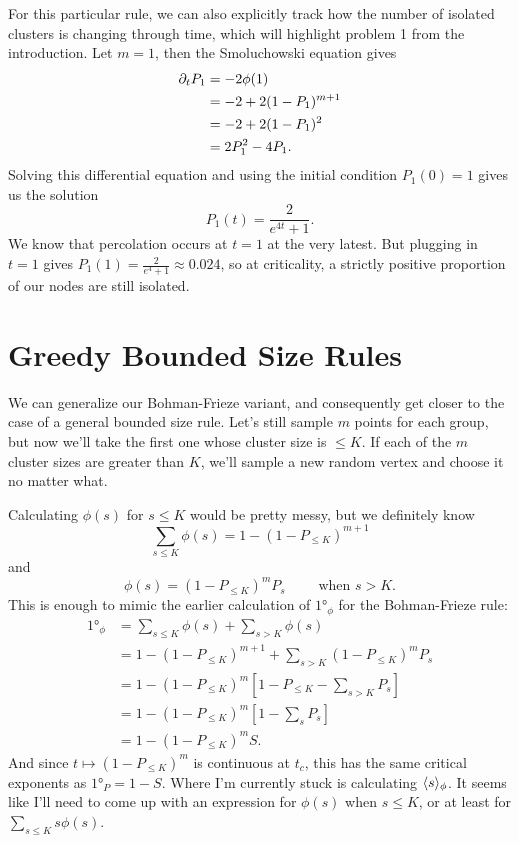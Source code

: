 \documentclass[twoside,10pt]{article}
\newcommand{\BF}{Bohman-Frieze\xspace}
\begin{document}
For this particular rule, we can also explicitly track how the number of isolated clusters is changing through time, which will highlight problem 1 from the introduction. Let $m=1$, then the Smoluchowski equation gives
\begin{align*}
	\partial_{t}{P_1} &= -2 \phi(1) \\
		    &= -2 + 2(1-P_1)^{m+1} \\
		    &= -2 + 2(1-P_1)^{2} \\
		    &= 2P_1^{2} - 4P_1.
\end{align*}
Solving this differential equation and using the initial condition $P_1(0)=1$ gives us the solution
\[
	P_1(t) = \frac{2}{e^{4t}+1} .
\] 
We know that percolation occurs at $t=1$ at the very latest. But plugging in $t=1$ gives $P_1(1) = \frac{2}{e^{4}+1} \approx 0.024$, so at criticality, a strictly positive proportion of our nodes are still isolated.

\section{Greedy Bounded Size Rules}

We can generalize our \BF variant, and consequently get closer to the case of a general bounded size rule. Let's still sample $m$ points for each group, but now we'll take the first one whose cluster size is $\leq K$. If each of the $m$ cluster sizes are greater than $K$, we'll sample a new random vertex and choose it no matter what.

Calculating $\phi(s)$ for $s \leq K$ would be pretty messy, but we definitely know
\[
	\sum_{s \leq K} \phi(s) = 1 - (1-P_{\leq K})^{m+1}
\] and
\[
	\phi(s) = (1-P_{\leq K})^{m}P_{s} \qquad \text{ when } s>K.
\] This is enough to mimic the earlier calculation of $\ang{1}_{\phi}$ for the \BF rule:
\begin{align*}
	\ang{1}_{\phi} &= \sum_{s \leq K}\phi(s) + \sum_{s > K}\phi(s) \\
		       &= 1 - (1-P_{\leq K})^{m+1} + \sum_{s>K}(1-P_{\leq K})^{m}P_s \\
		       &= 1 - (1-P_{\leq K})^{m} \left[ 1 - P_{\leq K}-\sum_{s>K}P_s \right] \\
		       &= 1 - (1-P_{\leq K})^{m} \left[ 1 - \sum_s P_s \right] \\
		       &= 1 - (1-P_{\leq K})^{m} S.
\end{align*}
And since $t \mapsto (1-P_{\leq K})^{m}$ is continuous at $t_c$, this has the same critical exponents as $\ang{1}_{P} = 1-S$. {\color{blue}Where I'm currently stuck is calculating $\langle s \rangle_{\phi}$. It seems like I'll need to come up with an expression for $\phi(s)$ when $s \leq K$, or at least for $\sum_{s \leq K}s \phi(s)$.}
\end{document}
